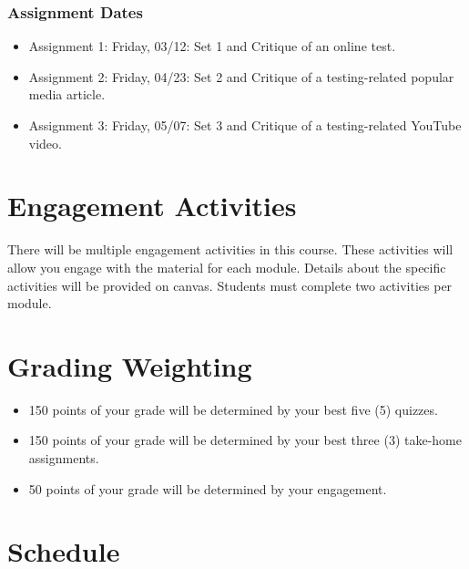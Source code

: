 \hypertarget{assignment-dates-1}{%
\subsubsection*{Assignment Dates}\label{assignment-dates-1}}


\begin{itemize}
\item
  Assignment 1: Friday, 03/12: Set 1 and Critique of an online test.
\item
  Assignment 2: Friday, 04/23: Set 2 and Critique of a testing-related popular media article.
\item
  Assignment 3: Friday, 05/07: Set 3 and Critique of a testing-related YouTube video.
\end{itemize}

\hypertarget{engagement-activities-2}{%
\section*{Engagement Activities}\label{engagement-activities-2}}


There will be multiple engagement activities in this course. These activities will allow you engage with the material for each module. Details about the specific activities will be provided on canvas. Students must complete two activities per module.

\hypertarget{grading-weighting-1}{%
\section*{Grading Weighting}\label{grading-weighting-1}}


\begin{itemize}
\tightlist
\item
  150 points of your grade will be determined by your best five (5) quizzes.
\item
  150 points of your grade will be determined by your best three (3) take-home assignments.
\item
  50 points of your grade will be determined by your engagement.
\end{itemize}

\hypertarget{schedule-2}{%
\section*{Schedule}\label{schedule-2}}


